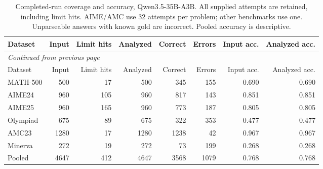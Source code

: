 \begingroup\scriptsize\setlength{\tabcolsep}{4pt}
\begin{longtable}{@{}lrrrrrrr@{}}
\caption{Completed-run coverage and accuracy, Qwen3.5-35B-A3B. All supplied attempts are retained, including limit hits. AIME/AMC use 32 attempts per problem; other benchmarks use one. Unparseable answers with known gold are incorrect. Pooled accuracy is descriptive.}\label{tab:qwen-corr-data}\\
\toprule
Dataset & Input & Limit hits & Analyzed & Correct & Errors & Input acc. & Analyzed acc. \\
\midrule\endfirsthead
\multicolumn{8}{l}{\textit{Continued from previous page}}\\
\toprule
Dataset & Input & Limit hits & Analyzed & Correct & Errors & Input acc. & Analyzed acc. \\
\midrule\endhead
\bottomrule\endfoot
MATH-500 & 500 & 17 & 500 & 345 & 155 & 0.690 & 0.690 \\
AIME24 & 960 & 105 & 960 & 817 & 143 & 0.851 & 0.851 \\
AIME25 & 960 & 165 & 960 & 773 & 187 & 0.805 & 0.805 \\
Olympiad & 675 & 89 & 675 & 322 & 353 & 0.477 & 0.477 \\
AMC23 & 1280 & 17 & 1280 & 1238 & 42 & 0.967 & 0.967 \\
Minerva & 272 & 19 & 272 & 73 & 199 & 0.268 & 0.268 \\
Pooled & 4647 & 412 & 4647 & 3568 & 1079 & 0.768 & 0.768 \\
\end{longtable}\endgroup

